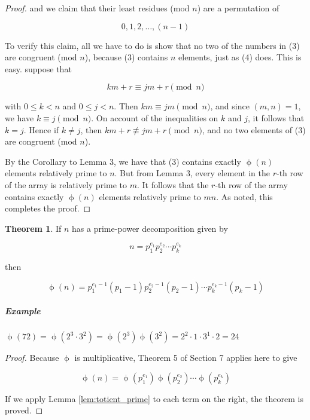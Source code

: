\documentclass{article}
\theoremstyle{definition} %
\newtheorem{theorem}{Theorem}[section] %
\theoremstyle{definition}
\theoremstyle{definition}
\newcommand{\tot}{\upphi}
\theoremstyle{definition}
\begin{document}
\begin{proof}
    and we claim that their least residues (mod $n$) are a permutation of
    
    \begin{equation}
      0, 1, 2, \dots, (n-1)
    \end{equation}
    
    To verify this claim, all we have to do is show that no two of the numbers
    in (3) are congruent (mod $n$), because (3) contains $n$ elements, just
    as (4) does. This is easy. suppose that
    
    \[
      km + r \equiv jm + r \pmod{n}
    \]
    
    with $0 \leq k < n$ and $0 \leq j < n$. Then $km \equiv jm \pmod{n}$, and
    since $(m, n) = 1$, we have $k \equiv j \pmod{n}$. On account of the inequalities
    on $k$ and $j$, it follows that $k = j$. Hence if $k \neq j$, then $km + r \nequiv jm + r \pmod{n}$,
    and no two elements of (3) are congruent (mod $n$).
    
    By the Corollary to Lemma 3, we have that (3) contains exactly $\tot(n)$ elements relatively
    prime to $n$. But from Lemma 3, every element in the $r$-th row of the array is
    relatively prime to $m$. It follows that the $r$-th row of the array contains exactly
    $\tot(n)$ elements relatively prime to $mn$. As noted, this completes the proof.
  \end{proof}
  
  \begin{theorem}
    If $n$ has a prime-power decomposition given by
    
    \[ n = p_1^{e_1} p_2^{e_2} \cdots p_k^{e_k} \]
    
    then
    
    \[ \tot(n) = p_1^{e_1-1}(p_1-1)p_2^{e_2-1}(p_2-1)\cdots p_k^{e_k-1}(p_k-1) \]
  \end{theorem}
  
  \subparagraph{Example} $\tot(72) = \tot(2^3 \cdot 3^2) = \tot(2^3)\tot(3^2) = 2^2 \cdot 1 \cdot 3^1 \cdot 2 = 24$
  
  \begin{proof}
    Because $\tot$ is multiplicative, Theorem 5 of Section 7 applies here to give
    
    \[ \tot(n) = \tot(p_1^{e_1})\tot(p_2^{e_2})\cdots \tot(p_k^{e_k}) \]
    
    If we apply Lemma \ref{lem:totient_prime} to each term on the right, the theorem is proved.
  \end{proof}
  
\end{document}
